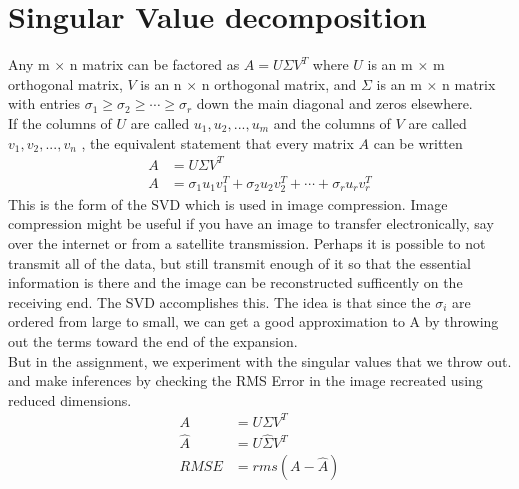 \documentclass{article}
\begin{document}
\section{Singular Value decomposition}
Any m $\times$ n matrix can be factored as $A = U \Sigma V^T$ where $U$ is an m $\times$ m orthogonal matrix, $V$
is an n $\times$ n orthogonal matrix, and $\Sigma$ is an m $\times$ n matrix with entries $\sigma_1 \geq \sigma_2 \geq \cdots \geq \sigma_r$ down the main diagonal and zeros elsewhere.\\
If the columns of $U$ are called $u_1 , u_2 , . . . , u_m$ and the columns of $V$ are called $v_1 , v_2 , . . . , v_n$ , the equivalent statement that every matrix $A$ can be written\\
\begin{align}
  A &= U \Sigma V^T\\
  A &= \sigma_1 u_1 v_1^T + \sigma_2 u_2 v_2^T + \cdots + \sigma_r u_r v_r^T
\end{align}
This is the form of the SVD which is used in image compression. Image compression might be useful if you
have an image to transfer electronically, say over the internet or from a satellite transmission. Perhaps it is
possible to not transmit all of the data, but still transmit enough of it so that the essential information is
there and the image can be reconstructed sufficently on the receiving end. The SVD accomplishes this. The
idea is that since the $\sigma_i$ are ordered from large to small, we can get a good approximation to A by throwing
out the terms toward the end of the expansion.\\
But in the assignment, we experiment with the singular values that we throw out. and make inferences by checking the RMS Error in the image recreated using reduced dimensions.\\
\begin{align}
  A &= U \Sigma V^T\\
  \hat{A} &= U \hat{\Sigma} V^T \nonumber \\
  RMSE &= rms(A - \hat{A})
\end{align}
\end{document}
